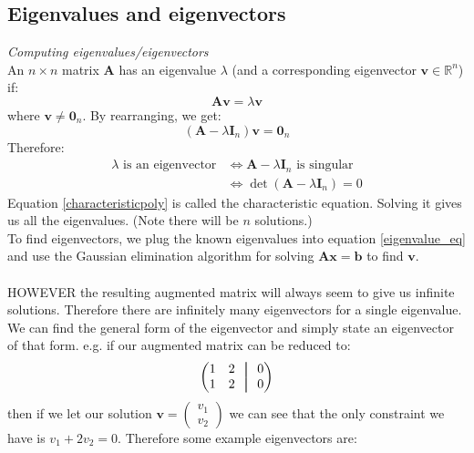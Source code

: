 \documentclass{scrartcl}
\newcommand{\R}{\mathbb{R}}
\newcommand\aug{\fboxsep=-\fboxrule\!\!\!\fbox{\strut}\!\!\!}
\renewcommand{\vec}[1]{\mathbf{#1}}
\begin{document}
\subsection{Eigenvalues and eigenvectors}

\textit{Computing eigenvalues/eigenvectors}
\\
An $ n \times n $ matrix $ \vec{A} $ has an eigenvalue $ \lambda $ (and a corresponding eigenvector $ \vec{v} \in \R^{n} $) if:
\begin{equation}
\vec{Av} = \lambda \vec{v}
\end{equation}
where $ \vec{v} \neq \vec{0}_{n} $. By rearranging, we get:
\begin{equation} \label{eigenvalue_eq}
(\vec{A} - \lambda \vec{I}_{n})\vec{v} = \vec{0}_{n}
\end{equation}
Therefore:
\begin{align}
\lambda \textrm{ is an eigenvector} & \Leftrightarrow \vec{A} - \lambda \vec{I}_{n} \textrm{ is singular} \\
& \Leftrightarrow \det (\vec{A} - \lambda \vec{I}_{n}) = 0 \label{characteristicpoly}
\end{align}
Equation \ref{characteristicpoly} is called the characteristic equation. Solving it gives us all the eigenvalues. (Note there will be $ n $ solutions.)
\\
To find eigenvectors, we plug the known eigenvalues into equation \ref{eigenvalue_eq} and use the Gaussian elimination algorithm for solving $ \vec{Ax = b} $ to find $ \vec{v} $.
\\\\
HOWEVER the resulting augmented matrix will always seem to give us infinite solutions. Therefore there are infinitely many eigenvectors for a single eigenvalue. We can find the general form of the eigenvector and simply state an eigenvector of that form. e.g. if our augmented matrix can be reduced to:
\begin{equation}
\begin{pmatrix}
1 & 2 & \ \aug \ & 0 \\
1 & 2 & \ \aug \ & 0 \\
\end{pmatrix}
\end{equation}
then if we let our solution $ \vec{v} = \begin{pmatrix}
v_{1} \\ v_{2}
\end{pmatrix} $ we can see that the only constraint we have is $ v_{1} + 2v_{2} = 0 $. Therefore some example eigenvectors are:
\end{document}
